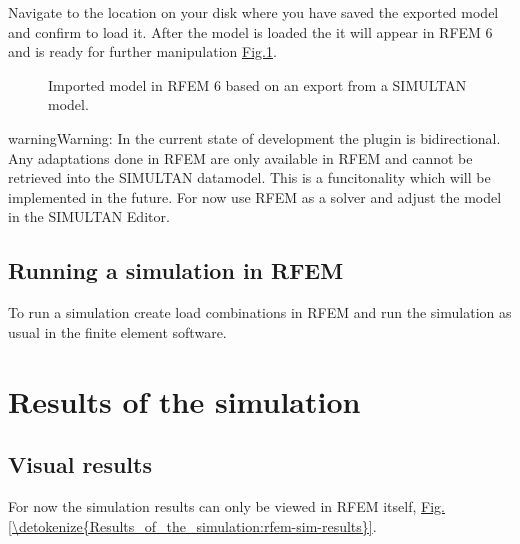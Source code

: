 \documentclass[letterpaper,10pt,english]{jupyterBook}
\let\sphinxpxdimen\pdfpxdimen\else\newdimen\sphinxpxdimen
\begin{document}
\sphinxAtStartPar
Navigate to the location on your disk where you have saved the exported model and confirm to load it. After the model is
loaded the it will appear in RFEM 6 and is ready for further manipulation \hyperref[\detokenize{Running_a_simulation:model-in-rfem}]{Fig.\@ \ref{\detokenize{Running_a_simulation:model-in-rfem}}}.

\begin{figure}[htbp]
\centering
\capstart

\noindent\sphinxincludegraphics[height=250\sphinxpxdimen]{{model_in_rfem}.jpg}
\caption{Imported model in RFEM 6 based on an export from a SIMULTAN model.}\label{\detokenize{Running_a_simulation:model-in-rfem}}\end{figure}

\begin{sphinxadmonition}{warning}{Warning:}
\sphinxAtStartPar
In the current state of development the plugin is  bidirectional. Any adaptations done in RFEM are only
available in RFEM and cannot be retrieved into the SIMULTAN datamodel. This is a funcitonality which will be
implemented in the future. For now use RFEM as a solver and adjust the model in the SIMULTAN Editor.
\end{sphinxadmonition}


\section{Running a simulation in RFEM}
\label{\detokenize{Running_a_simulation:running-a-simulation-in-rfem}}
\sphinxAtStartPar
To run a simulation create load combinations in RFEM and run the simulation as usual in the finite element software.

\sphinxstepscope


\chapter{Results of the simulation}
\label{\detokenize{Results_of_the_simulation:results-of-the-simulation}}\label{\detokenize{Results_of_the_simulation:id1}}\label{\detokenize{Results_of_the_simulation::doc}}

\section{Visual results}
\label{\detokenize{Results_of_the_simulation:visual-results}}
\sphinxAtStartPar
For now the simulation results can only be viewed in RFEM itself, \hyperref[\detokenize{Results_of_the_simulation:rfem-sim-results}]{Fig.\@ \ref{\detokenize{Results_of_the_simulation:rfem-sim-results}}}.
\end{document}
